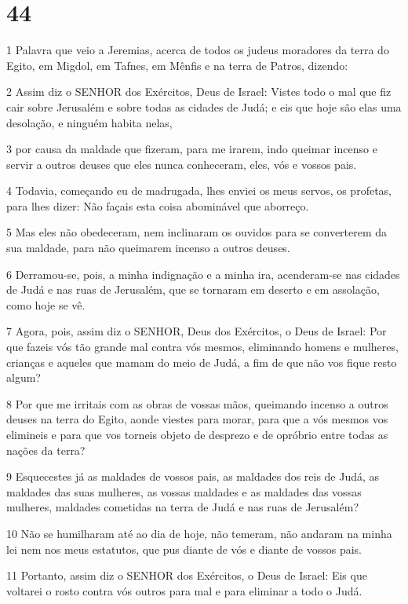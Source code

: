\chapter{44}

\par 1 Palavra que veio a Jeremias, acerca de todos os judeus moradores da terra do Egito, em Migdol, em Tafnes, em Mênfis e na terra de Patros, dizendo:
\par 2 Assim diz o SENHOR dos Exércitos, Deus de Israel: Vistes todo o mal que fiz cair sobre Jerusalém e sobre todas as cidades de Judá; e eis que hoje são elas uma desolação, e ninguém habita nelas,
\par 3 por causa da maldade que fizeram, para me irarem, indo queimar incenso e servir a outros deuses que eles nunca conheceram, eles, vós e vossos pais.
\par 4 Todavia, começando eu de madrugada, lhes enviei os meus servos, os profetas, para lhes dizer: Não façais esta coisa abominável que aborreço.
\par 5 Mas eles não obedeceram, nem inclinaram os ouvidos para se converterem da sua maldade, para não queimarem incenso a outros deuses.
\par 6 Derramou-se, pois, a minha indignação e a minha ira, acenderam-se nas cidades de Judá e nas ruas de Jerusalém, que se tornaram em deserto e em assolação, como hoje se vê.
\par 7 Agora, pois, assim diz o SENHOR, Deus dos Exércitos, o Deus de Israel: Por que fazeis vós tão grande mal contra vós mesmos, eliminando homens e mulheres, crianças e aqueles que mamam do meio de Judá, a fim de que não vos fique resto algum?
\par 8 Por que me irritais com as obras de vossas mãos, queimando incenso a outros deuses na terra do Egito, aonde viestes para morar, para que a vós mesmos vos elimineis e para que vos torneis objeto de desprezo e de opróbrio entre todas as nações da terra?
\par 9 Esquecestes já as maldades de vossos pais, as maldades dos reis de Judá, as maldades das suas mulheres, as vossas maldades e as maldades das vossas mulheres, maldades cometidas na terra de Judá e nas ruas de Jerusalém?
\par 10 Não se humilharam até ao dia de hoje, não temeram, não andaram na minha lei nem nos meus estatutos, que pus diante de vós e diante de vossos pais.
\par 11 Portanto, assim diz o SENHOR dos Exércitos, o Deus de Israel: Eis que voltarei o rosto contra vós outros para mal e para eliminar a todo o Judá.
